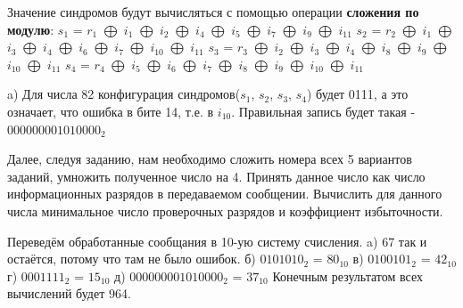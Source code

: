 	\newpage
	\begin{flushleft}
		\small Значение синдромов будут вычисляться с помощью операции \textbf{сложения по модулю}:
		\linebreak
		$s_1$ = $r_1$ $\bigoplus$ $i_1$ $\bigoplus$ $i_2$ $\bigoplus$ $i_4$ $\bigoplus$ $i_5$ $\bigoplus$ $i_7$ $\bigoplus$ $i_9$ $\bigoplus$ $i_{11}$		
		\linebreak
		$s_2$ = $r_2$ $\bigoplus$ $i_1$ $\bigoplus$ $i_3$ $\bigoplus$ $i_4$ $\bigoplus$ $i_6$ $\bigoplus$ $i_7$ $\bigoplus$ $i_{10}$ $\bigoplus$ $i_{11}$
		\linebreak
		$s_3$ = $r_3$ $\bigoplus$ $i_2$ $\bigoplus$ $i_3$ $\bigoplus$ $i_4$ $\bigoplus$ $i_8$ $\bigoplus$ $i_9$ $\bigoplus$ $i_{10}$ $\bigoplus$ $i_{11}$
		\linebreak
		$s_4$ = $r_4$ $\bigoplus$ $i_5$ $\bigoplus$ $i_6$ $\bigoplus$ $i_7$ $\bigoplus$ $i_8$ $\bigoplus$ $i_9$ $\bigoplus$ $i_{10}$ $\bigoplus$ $i_{11}$
		\linebreak
		\vspace*{5mm}
		
		\small a) Для числа 82 конфигурация синдромов($s_1$, $s_2$, $s_3$, $s_4$) будет 0111, а это означает, что ошибка в бите 14, т.е. в $i_{10}$. Правильная запись будет такая - $000000001010000_2$
		\linebreak
		\vspace*{5mm}
		
		\small Далее, следуя заданию, нам необходимо сложить номера всех 5 вариантов заданий, умножить полученное число на 4. Принять данное число как число информационных разрядов в
		передаваемом сообщении. Вычислить для данного числа минимальное
		число проверочных разрядов и коэффициент избыточности.
		\linebreak
		\vspace*{5mm}
		
		\small Переведём обработанные сообщания в 10-ую систему счисления.
		\linebreak
		\small a) 67 так и остаётся, потому что там не было ошибок.
		\linebreak
		\small б) $0101010_2$ = $80_{10}$
		\linebreak
		\small в) $0100101_2$ = $42_{10}$
		\linebreak
		\small г) $0001111_2$ = $15_{10}$
		\linebreak
		\small д) $000000001010000_2$ = $37_{10}$
		\linebreak
		\small Конечным результатом всех вычислений будет 964.
		\linebreak
		\vspace*{5mm}
		

\end{flushleft}
